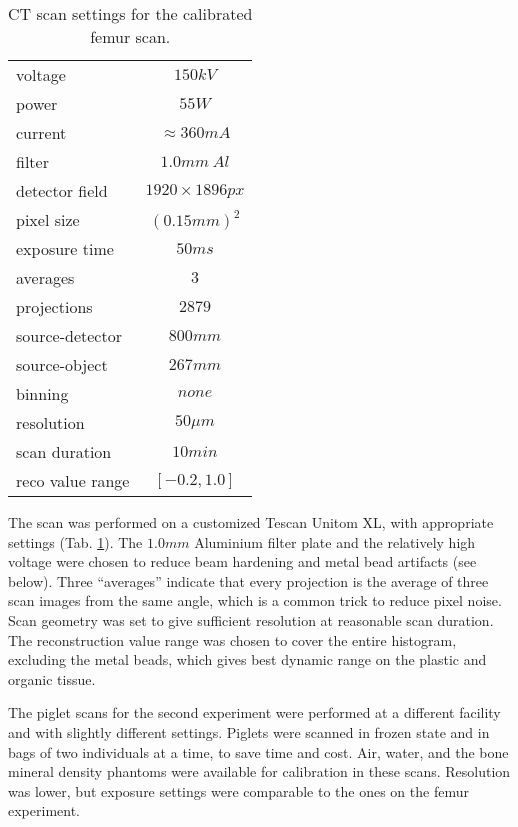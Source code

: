 \begin{table}[htbp]
\caption{\label{tab:ct_settings}CT scan settings for the calibrated femur scan.}
\centering
\begin{tabular}{|l|c|}
\hline
voltage & \(150 kV\)\\[0pt]
power & \(55 W\)\\[0pt]
current & \(\approx 360 mA\)\\[0pt]
filter & \(1.0 mm\ Al\)\\[0pt]
detector field & \(1920\times 1896 px\)\\[0pt]
pixel size & \((0.15 mm)^{2}\)\\[0pt]
exposure time & \(50 ms\)\\[0pt]
averages & \(3\)\\[0pt]
projections & \(2879\)\\[0pt]
source-detector & \(800 mm\)\\[0pt]
source-object & \(267 mm\)\\[0pt]
binning & \(none\)\\[0pt]
resolution & \(50 \mu m\)\\[0pt]
scan duration & \(10 min\)\\[0pt]
reco value range & \([-0.2, 1.0]\)\\[0pt]
\hline
\end{tabular}
\end{table}

The scan was performed on a customized Tescan Unitom XL, with appropriate settings (Tab. \ref{tab:ct_settings}).
The \(1.0 mm\) Aluminium filter plate and the relatively high voltage were chosen to reduce beam hardening and metal bead artifacts (see below).
Three ``averages'' indicate that every projection is the average of three scan images from the same angle, which is a common trick to reduce pixel noise.
Scan geometry was set to give sufficient resolution at reasonable scan duration.
The reconstruction value range was chosen to cover the entire histogram, excluding the metal beads, which gives best dynamic range on the plastic and organic tissue.


The piglet scans for the second experiment were performed at a different facility and with slightly different settings.
Piglets were scanned in frozen state and in bags of two individuals at a time, to save time and cost.
Air, water, and the bone mineral density phantoms were available for calibration in these scans.
Resolution was lower, but exposure settings were comparable to the ones on the femur experiment.



